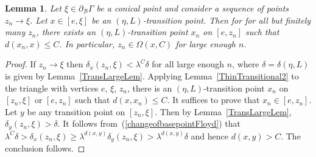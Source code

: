 \documentclass{amsart}
\newcommand{\showcomments}{yes}
\newenvironment{comment}%
{\ifthenelse{\equal{\showcomments}{yes}}%
{\footnotemark
    \begin{lrbox}{\commentbox}
    \begin{minipage}[t]{1.25in}\raggedright\sffamily\upshape\tiny
    \footnotemark[\arabic{footnote}]}%
{\begin{lrbox}{\commentbox}}}%
{\ifthenelse{\equal{\showcomments}{yes}}%
{\end{minipage}\end{lrbox}\marginpar{\usebox{\commentbox}}}%
{\end{lrbox}}}
\newtheorem{lem}[thm]{Lemma}
\theoremstyle{definition}
\theoremstyle{remark}
\newcommand{\lw}[1]{{\color{cyan}{#1}}}
\begin{document}
 
\begin{lem}\label{ConvConicalLem}
Let $\xi\in \partial_{\mathcal B} \Gamma$ be a conical point and consider a sequence of points $z_n\to \xi$.
Let $x\in [e,\xi]$ be an $(\eta, L)$-transition point. Then   for for all  but finitely many $z_n$,   there exists an $(\eta,L)$-transition point $x_n$ on $[e, z_n]$ such that $d(x_n, x)\le C$.  In particular,  $z_n\in \Omega(x, C)$ for large enough $n$.

\end{lem}
\begin{proof}
If $z_n\to \xi$ then $\delta_x(z_n, \xi) < \lambda^C \delta$ for all large enough $n$, where $\delta=\delta(\eta,L)$ is given by Lemma~\ref{TransLargeLem}.
Applying Lemma~\ref{ThinTransitional2} to the triangle with vertices $e$, $\xi$, $z_n$, there is an $(\eta, L)$-transition point $x_n$ on $[z_n, \xi]$ or $[e, z_n]$ such that $d(x, x_n) \leq C$. 
It suffices to prove that $x_n \in [e, z_n]$. 
Let $y$ be any transition point on $[z_n, \xi]$. 
Then by Lemma~\ref{TransLargeLem}, $\delta_y(z_n, \xi) > \delta$.  It follows from~(\ref{changeofbasepointFloyd}) that $\lambda^C \delta > \delta_x(z_n, \xi) \geq \lambda^{d(x, y)} \delta_y(z_n, \xi)>\lambda^{d(x,y)}\delta$ and hence $d(x, y) > C$. The conclusion follows.
\end{proof}
\end{document}
